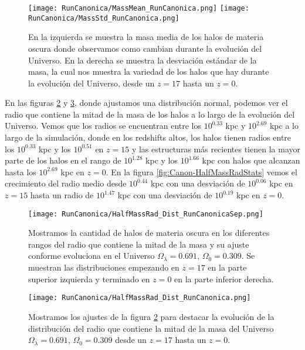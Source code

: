 \begin{figure}[H]
    \centering
    \texttt{[image: RunCanonica/MassMean\_RunCanonica.png]}
    \texttt{[image: RunCanonica/MassStd\_RunCanonica.png]}
    \caption[Media y desviación estándar de la distribución de masa]{\footnotesize En la izquierda se muestra la masa media de los halos de materia oscura donde observamos como cambian durante la evolución del Universo. En la derecha se muestra la desviación estándar de la masa, la cual nos muestra la variedad de los halos que hay durante la evolución del Universo, desde un $z=17$ hasta un $z=0$.}
    \label{fig:Canon-MassStats}
\end{figure}

En las figuras \ref{fig:Canon-HalfMassRadDistSep} y \ref{fig:Canon-HalfMassRadDist}, {\morado donde ajustamos una distribución normal,} podemos ver el radio que contiene la mitad de la masa de los halos a lo largo de la evolución del Universo. Vemos que los radios se encuentran entre los $10^{0.33}$ kpc y $10^{2.69}$ kpc {\morado a lo largo de la simulación, donde en los redshifts altos, los halos} tienen radios entre los $10^{0.33}$ kpc y los $10^{0.51}$ en $z=15$ y las estructuras más recientes tienen la mayor parte de los halos en el rango de $10^{1.28}$ kpc y los $10^{1.66}$ kpc con halos que alcanzan hasta los $10^{2.69}$ kpc en $z=0$. En la figura \ref{fig:Canon-HalfMassRadStats} vemos el crecimiento del radio medio desde $10^{0.44}$ kpc con una desviación de $10^{0.06}$ kpc en $z=15$ hasta un radio de $10^{1.47}$ kpc con una desviación de $10^{0.19}$ kpc en $z=0$.

\begin{figure}[H]
    \centering
    \texttt{[image: RunCanonica/HalfMassRad\_Dist\_RunCanonicaSep.png]}
    \caption[Radio que contiene la mitad de la masa]{\footnotesize Mostramos la cantidad de halos de materia oscura en los diferentes rangos del radio que contiene la mitad de la masa y su ajuste conforme evoluciona en el Universo $\Omega_\lambda = 0.691 $, $\Omega_0 = 0.309$. Se muestran las distribuciones empezando en $z=17$ en la parte superior izquierda y terminado en $z=0$ en la parte inferior derecha.} 
    \label{fig:Canon-HalfMassRadDistSep}
\end{figure}

\begin{figure}[H]
    \centering
    \texttt{[image: RunCanonica/HalfMassRad\_Dist\_RunCanonica.png]}
    \caption[Distribución del radio que contiene la mitad de la masa]{\footnotesize Mostramos los ajustes de la figura \ref{fig:Canon-HalfMassRadDistSep} para destacar la evolución de la distribución del radio que contiene la mitad de la masa del Universo $\Omega_\lambda = 0.691 $, $\Omega_0 = 0.309$ desde un $z=17$ hasta un $z=0$.}
    \label{fig:Canon-HalfMassRadDist}
\end{figure}

